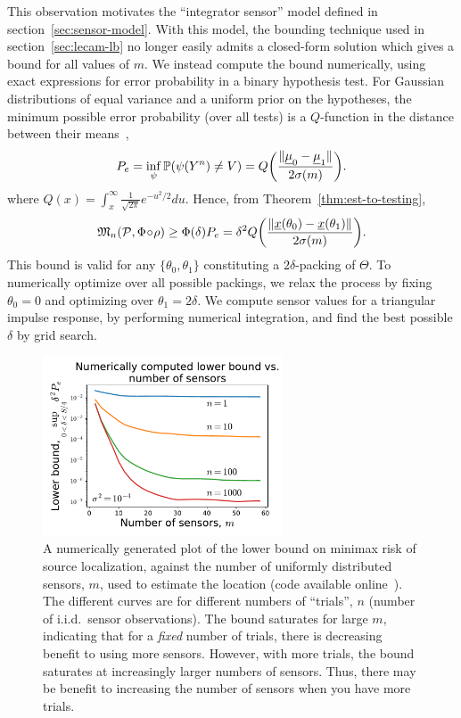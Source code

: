 \documentclass[conference]{IEEEtran}
\providecommand{\v}{}
\renewcommand{\v}[1]{\underline{#1}}
\DeclarePairedDelimiter\norm{\lVert}{\rVert}
\newcommand{\Phiorho}{\Phi\!\circ\!\rho}
\begin{document}
This observation motivates the ``integrator sensor'' model defined in
section~\ref{sec:sensor-model}. With this model, the bounding technique used in
section~\ref{sec:lecam-lb} no longer easily admits a closed-form solution which
gives a bound for all values of $m$. We instead compute the bound numerically,
using exact expressions for error probability in a binary hypothesis test. For
Gaussian distributions of equal variance and a uniform prior on the hypotheses,
the minimum possible error probability (over all tests) is a $Q$-function in
the distance between their means~\cite[Ch.~7]{Scharf1991Statistical},
\begin{equation}
	P_e = \inf_\psi \mathbb P(\psi(Y^n) \neq V) = Q\bigg(\frac{\norm{\v\mu_0 - \v\mu_1}}{2\sigma(m)}\bigg).
\end{equation}
where $Q(x) = \int_x^\infty \frac{1}{\sqrt{2\pi}} e^{-u^2/2} du$. Hence, from
Theorem~\ref{thm:est-to-testing},
\begin{equation}
	\mathfrak{M}_n(\mathcal{P}, \Phiorho) \geq \Phi(\delta) P_e = \delta^2 Q\bigg(\frac{\norm{\v x(\theta_0) - \v x(\theta_1)}}{2\sigma(m)}\bigg).
\end{equation}
This bound is valid for any $\{\theta_0, \theta_1\}$ constituting a
$2\delta$-packing of $\Theta$. To numerically optimize over all possible
packings, we relax the process by fixing $\theta_0 = 0$ and optimizing over
$\theta_1 = 2\delta$.  We compute sensor values for a triangular impulse
response, by performing numerical integration, and find the best possible
$\delta$ by grid search.

\begin{figure}[t]
	\centering
	\includegraphics[width=2.8in]{lb-vs-m-annotated}
	\caption{A numerically generated plot of the lower bound on minimax risk of
		source localization, against the number of uniformly distributed
		sensors, $m$, used to estimate the location (code available
		online~\cite{Code}). The different curves are for different numbers of
		``trials'', $n$ (number of i.i.d.\ sensor observations). The bound
		saturates for large $m$, indicating that for a \emph{fixed} number of
		trials, there is decreasing benefit to using more sensors.  However,
	with more trials, the bound saturates at increasingly larger numbers of
sensors. Thus, there may be benefit to increasing the number of sensors when
you have more trials.}
	\label{fig:numerical}
\end{figure}
\end{document}
